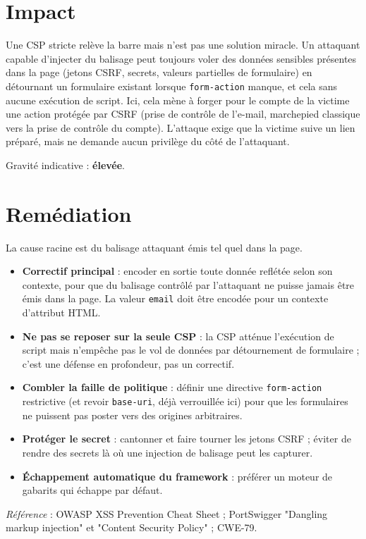 \documentclass[11pt,a4paper]{article}
\begin{document}
\section{Impact}
Une CSP stricte relève la barre mais n'est pas une solution miracle. Un
attaquant capable d'injecter du balisage peut toujours voler des données
sensibles présentes dans la page (jetons CSRF, secrets, valeurs partielles de
formulaire) en détournant un formulaire existant lorsque \texttt{form-action}
manque, et cela sans aucune exécution de script. Ici, cela mène à forger pour
le compte de la victime une action protégée par CSRF (prise de contrôle de
l'e-mail, marchepied classique vers la prise de contrôle du compte). L'attaque
exige que la victime suive un lien préparé, mais ne demande aucun privilège du
côté de l'attaquant.

Gravité indicative : \textbf{élevée}.

\section{Remédiation}
La cause racine est du balisage attaquant émis tel quel dans la page.

\begin{itemize}
  \item \textbf{Correctif principal} : encoder en sortie toute donnée reflétée selon son contexte, pour que du balisage contrôlé par l'attaquant ne puisse jamais être émis dans la page. La valeur \texttt{email} doit être encodée pour un contexte d'attribut HTML.
  \item \textbf{Ne pas se reposer sur la seule CSP} : la CSP atténue l'exécution de script mais n'empêche pas le vol de données par détournement de formulaire ; c'est une défense en profondeur, pas un correctif.
  \item \textbf{Combler la faille de politique} : définir une directive \texttt{form-action} restrictive (et revoir \texttt{base-uri}, déjà verrouillée ici) pour que les formulaires ne puissent pas poster vers des origines arbitraires.
  \item \textbf{Protéger le secret} : cantonner et faire tourner les jetons CSRF ; éviter de rendre des secrets là où une injection de balisage peut les capturer.
  \item \textbf{Échappement automatique du framework} : préférer un moteur de gabarits qui échappe par défaut.
\end{itemize}

\vspace{4pt}
\noindent\emph{Référence} : OWASP XSS Prevention Cheat Sheet ; PortSwigger
"Dangling markup injection" et "Content Security Policy" ;
CWE-79.
\end{document}
